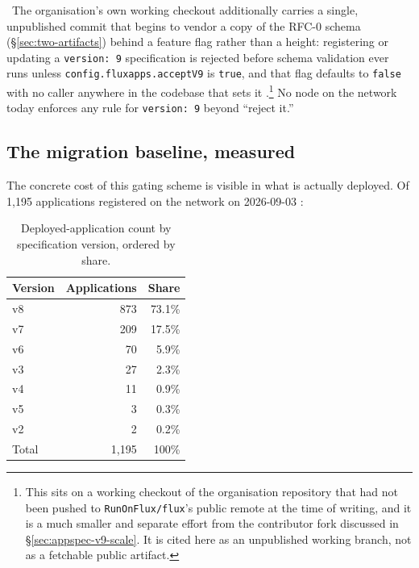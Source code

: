 \inprogress\ The organisation's own working checkout additionally carries a single, unpublished
commit that begins to vendor a copy of the RFC-0 schema (\S\ref{sec:two-artifacts}) behind a feature flag
rather than a height: registering or updating a \texttt{version: 9} specification is rejected
before schema validation ever runs unless \texttt{config.\allowbreak{}fluxapps.\allowbreak{}acceptV9} is \texttt{true}, and
that flag defaults to \texttt{false} with no caller anywhere in the codebase that sets it
.\footnote{%
This sits on a working checkout of the organisation repository that had not been pushed to
\texttt{RunOnFlux/flux}'s public remote at the time of writing, and it is a much smaller and
separate effort from the contributor fork discussed in \S\ref{sec:appspec-v9-scale}. It is cited
here as an unpublished working branch, not as a fetchable public artifact.} No node on the network
today enforces any rule for \texttt{version: 9} beyond ``reject it.''

\subsection{The migration baseline, measured}
\label{sec:migration-baseline}

The concrete cost of this gating scheme is visible in what is actually deployed. Of 1{,}195
applications registered on the network on 2026-09-03
:

\begin{table}[H]
\centering
\begin{tabular}{@{}lrr@{}}
\toprule
Version & Applications & Share \\
\midrule
v8 & 873 & 73.1\% \\
v7 & 209 & 17.5\% \\
v6 & 70 & 5.9\% \\
v3 & 27 & 2.3\% \\
v4 & 11 & 0.9\% \\
v5 & 3 & 0.3\% \\
v2 & 2 & 0.2\% \\
\midrule
Total & 1{,}195 & 100\% \\
\bottomrule
\end{tabular}
\caption{Deployed-application count by specification version, ordered by share.}
\end{table}

